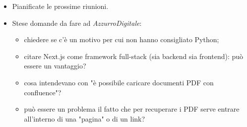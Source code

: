 \begin{itemize}
    \item Pianificate le prossime riunioni.
    \item Stese domande da fare ad \emph{AzzurroDigitale}:
    \begin{itemize}
        \item chiedere se c'è un motivo per cui non hanno consigliato Python;
        \item citare Next.js come framework full-stack (sia backend sia frontend): può essere un vantaggio?
        \item cosa intendevano con "è possibile caricare documenti PDF con confluence"? 
        \item può essere un problema il fatto che per recuperare i PDF serve entrare all'interno di una "pagina" o di un link?
    \end{itemize}








\end{itemize}